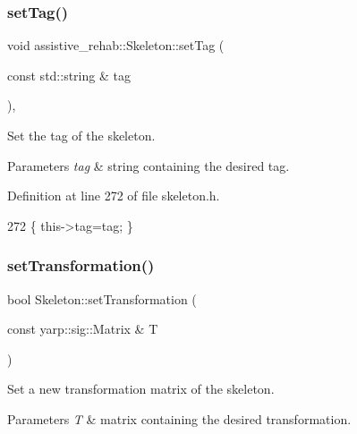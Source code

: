 \subsubsection{\texorpdfstring{set\+Tag()}{setTag()}}
{\footnotesize\ttfamily void assistive\+\_\+rehab\+::\+Skeleton\+::set\+Tag (\begin{DoxyParamCaption}\item[{const std\+::string \&}]{tag }\end{DoxyParamCaption})\hspace{0.3cm}{\ttfamily [inline]}, {\ttfamily [inherited]}}



Set the tag of the skeleton. 


\begin{DoxyParams}{Parameters}
{\em tag} & string containing the desired tag. \\
\hline
\end{DoxyParams}


Definition at line 272 of file skeleton.\+h.


\begin{DoxyCode}
272 \{ this->tag=tag; \}
\end{DoxyCode}
\mbox{\label{classassistive__rehab_1_1Skeleton_a3486cbd7f59e75c1d9ef26cbc05bb72f}} 
\subsubsection{\texorpdfstring{set\+Transformation()}{setTransformation()}}
{\footnotesize\ttfamily bool Skeleton\+::set\+Transformation (\begin{DoxyParamCaption}\item[{const yarp\+::sig\+::\+Matrix \&}]{T }\end{DoxyParamCaption})\hspace{0.3cm}{\ttfamily [inherited]}}



Set a new transformation matrix of the skeleton. 


\begin{DoxyParams}{Parameters}
{\em T} & matrix containing the desired transformation. \\
\hline
\end{DoxyParams}


